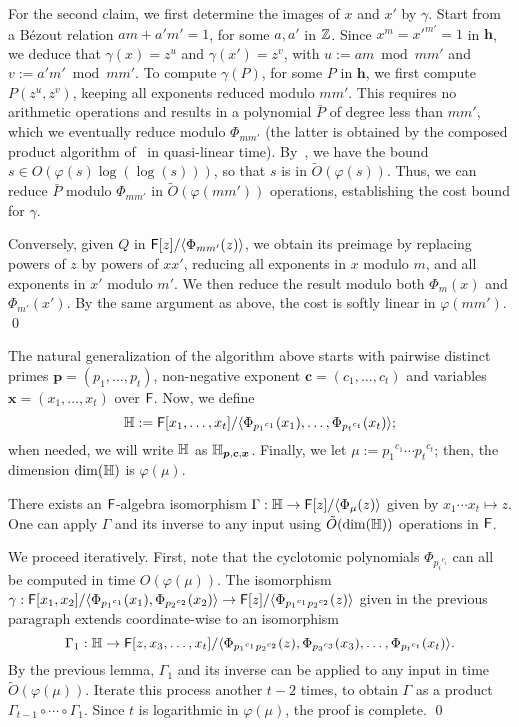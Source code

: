   For the second claim, we first determine the images of $x$ and $x'$
  by $\gamma$. Start from a B\'ezout relation $am+ a'm'=1$, for some
  $a,a'$ in $\mathbb{Z}$.  Since $x^m = {x'}^{m'}=1$ in $\mathbf{h}$, we
  deduce that $\gamma(x)=z^{u}$ and $\gamma(x') = z^{v}$, with $u:=am
  \bmod mm'$ and $v:=a'm' \bmod mm'$. To compute $\gamma(P)$, for some
  $P$ in $\mathbf{h}$, we first compute $P(z^u, z^v)$, keeping all
  exponents reduced modulo $mm'$. This requires no arithmetic
  operations and results in a polynomial $\bar P$ of degree less than
  $mm'$, which we eventually reduce modulo $\Phi_{mm'}$ (the latter is
  obtained by the composed product algorithm of~\cite{BoFlSaSc06} in
  quasi-linear time).  By~\cite[Theorem~8.8.7]{BacSha96}, we have the
  bound $s \in O(\varphi(s) \log(\log(s)))$, so that $s$ is in
  $\tilde{O}(\varphi(s))$. Thus, we can reduce $\bar P$ modulo
  $\Phi_{mm'}$ in $\tilde{O}(\varphi(mm'))$ operations, establishing
  the cost bound for $\gamma$.

  Conversely, given $Q$ in ${\mathsf{F}}[z]/\langle\Phi_{mm'}(z)\rangle$, we obtain
  its preimage by replacing powers of $z$ by powers of $xx'$, reducing all
  exponents in $x$ modulo $m$, and all exponents in $x'$ modulo $m'$.  We
  then reduce the result modulo both $\Phi_m(x)$ and $\Phi_{m'}(x')$.  By
  the same argument as above, the cost is softly linear in $\varphi(mm')$.
\qed

  The natural
generalization of the algorithm above starts with pairwise distinct
primes $\boldsymbol{p}=(p_1,\dots,p_t)$, non-negative exponent
$\boldsymbol{c}=(c_1,\dots,c_t)$ and variables
$\boldsymbol{x}=(x_1,\dots,x_t)$ over ${\mathsf{F}}$. Now, we define
$$\mathbb{H}:={\mathsf{F}}[x_1,\dots,x_t]/\langle
\Phi_{{p_1}^{c_1}}(x_1),\dots,\Phi_{{p_t}^{c_t}}(x_t)\rangle;$$ when
needed, we will write $\mathbb{H}$ as
$\mathbb{H}_{\boldsymbol{p},\boldsymbol{c},\boldsymbol{x}}$. Finally, we let
$\mu:={p_1}^{c_1}\cdots {p_t}^{c_t}$; then, the dimension $\dim(\mathbb{H})$ is
$\varphi(\mu)$.

\begin{lemma}\label{lemma:distinctP}
 There exists an ${\mathsf{F}}$-algebra isomorphism $\Gamma: \mathbb{H} \to
 {\mathsf{F}}[z]/\langle\Phi_{\mu}(z)\rangle$ given by $x_1 \cdots x_t \mapsto
 z$.  One can apply $\Gamma$ and its inverse to any input using
 $\tilde{O}(\dim(\mathbb{H}))$ operations in ${\mathsf{F}}$.
\end{lemma}
  We proceed iteratively. First, note that the cyclotomic polynomials
  $\Phi_{{p_i}^{c_i}}$ can all be computed in time $O(\varphi(\mu))$. 
  The isomorphism
  $\gamma: {\mathsf{F}}[x_1,x_2]/\langle \Phi_{{p_1}^{c_1}}(x_1),
  \Phi_{{p_2}^{c_2}}(x_2)\rangle \to {\mathsf{F}}[z]/\langle
  \Phi_{{p_1}^{c_1}{p_2}^{c_2}}(z)\rangle$
given in the previous paragraph extends coordinate-wise to an
  isomorphism
  $$\Gamma_1: \mathbb{H} \to {\mathsf{F}}[z,x_3,\dots,x_t]/\langle
  \Phi_{{p_1}^{c_1}{p_2}^{c_2}}(z),\Phi_{{p_3}^{c_3}}(x_3),\dots,\Phi_{{p_t}^{c_t}}(x_t)\rangle.$$
  By the previous lemma, $\Gamma_1$ and its inverse can be applied to
  any input in time $\tilde{O}(\varphi(\mu))$. Iterate this process
  another $t-2$ times, to obtain $\Gamma$ as a product
  $\Gamma_{t-1} \circ \cdots \circ \Gamma_1$. Since $t$ is logarithmic 
  in $\varphi(\mu)$, the proof is complete.
\qed

